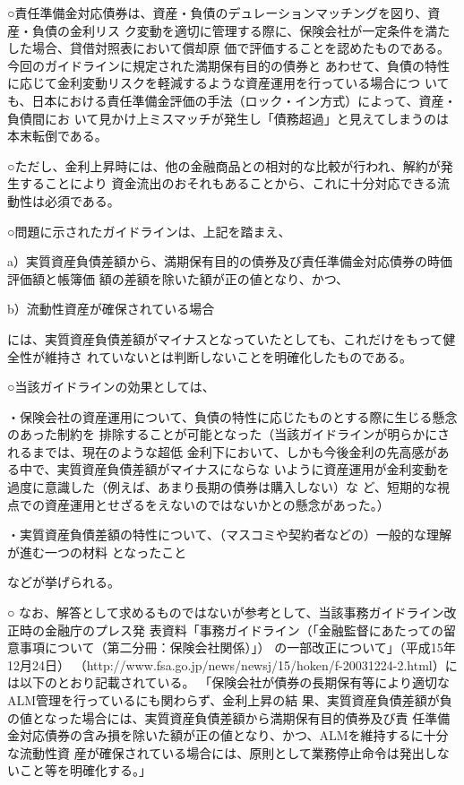 \documentclass[report,gutter=10mm,fore-edge=10mm,uplatex,dvipdfmx]{jlreq}
\begin{document}
○責任準備金対応債券は、資産・負債のデュレーションマッチングを図り、資産・負債の金利リス
ク変動を適切に管理する際に、保険会社が一定条件を満たした場合、貸借対照表において償却原
価で評価することを認めたものである。今回のガイドラインに規定された満期保有目的の債券と
あわせて、負債の特性に応じて金利変動リスクを軽減するような資産運用を行っている場合につ
いても、日本における責任準備金評価の手法（ロック・イン方式）によって、資産・負債間にお
いて見かけ上ミスマッチが発生し「債務超過」と見えてしまうのは本末転倒である。

○ただし、金利上昇時には、他の金融商品との相対的な比較が行われ、解約が発生することにより
資金流出のおそれもあることから、これに十分対応できる流動性は必須である。

○問題に示されたガイドラインは、上記を踏まえ、

a）実質資産負債差額から、満期保有目的の債券及び責任準備金対応債券の時価評価額と帳簿価
額の差額を除いた額が正の値となり、かつ、

b）流動性資産が確保されている場合

には、実質資産負債差額がマイナスとなっていたとしても、これだけをもって健全性が維持さ
れていないとは判断しないことを明確化したものである。

○当該ガイドラインの効果としては、

・保険会社の資産運用について、負債の特性に応じたものとする際に生じる懸念のあった制約を
排除することが可能となった（当該ガイドラインが明らかにされるまでは、現在のような超低
金利下において、しかも今後金利の先高感がある中で、実質資産負債差額がマイナスにならな
いように資産運用が金利変動を過度に意識した（例えば、あまり長期の債券は購入しない）な
ど、短期的な視点での資産運用とせざるをえないのではないかとの懸念があった。）

・実質資産負債差額の特性について、（マスコミや契約者などの）一般的な理解が進む一つの材料
となったこと

などが挙げられる。

○
なお、解答として求めるものではないが参考として、当該事務ガイドライン改正時の金融庁のプレス発
表資料「事務ガイドライン（「金融監督にあたっての留意事項について（第二分冊：保険会社関係）」）
の一部改正について」（平成15年12月24日）
（http://www.fsa.go.jp/news/newsj/15/hoken/f-20031224-2.html）には以下のとおり記載されている。
「保険会社が債券の長期保有等により適切なALM管理を行っているにも関わらず、金利上昇の結
果、実質資産負債差額が負の値となった場合には、実質資産負債差額から満期保有目的債券及び責
任準備金対応債券の含み損を除いた額が正の値となり、かつ、ALMを維持するに十分な流動性資
産が確保されている場合には、原則として業務停止命令は発出しないこと等を明確化する。」
\end{document}

